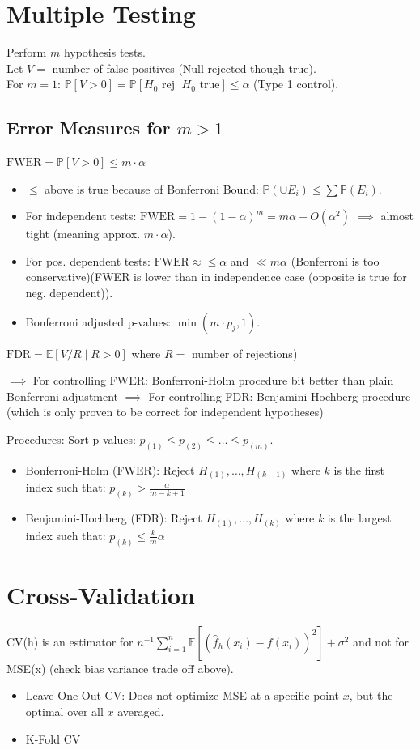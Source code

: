 \section{Multiple Testing}
Perform $m$ hypothesis tests.
\\ Let $V = $ number of false positives (Null rejected though true).
\\ For $m=1$: $\mathbb{P}[V > 0] = \mathbb{P}[H_0 \text{ rej } | H_0 \text{ true}] \leq \alpha$ (Type 1 control).

\subsection{Error Measures for $m > 1$}
$ \text{FWER} = \mathbb{P}[V > 0] \leq m \cdot \alpha $
\begin{itemize}
    \item $\leq$ above is true because of Bonferroni Bound: $\mathbb{P}(\cup E_i) \leq \sum \mathbb{P}(E_i)$.
    \item For independent tests:
    $ \text{FWER} = 1 - (1-\alpha)^m = m\alpha + O(\alpha^2) $
    $\implies$ almost tight (meaning approx. $m \cdot \alpha$).
    \item For pos. dependent tests: $\text{FWER} \approx \leq \alpha$ and $\ll m\alpha$ (Bonferroni is too conservative)(FWER is lower than in independence case (opposite is true for neg. dependent)).
    \item Bonferroni adjusted p-values: $\min(m \cdot p_j, 1)$.
\end{itemize}

$\text{FDR} = \mathbb{E}[V/R \mid R > 0]$ where $R =$ number of rejections)

$\implies$ For controlling FWER: Bonferroni-Holm procedure bit better than plain Bonferroni adjustment
$\implies$ For controlling FDR: Benjamini-Hochberg procedure (which is only proven to be correct for independent hypotheses)

Procedures: Sort p-values: $p_{(1)} \leq p_{(2)} \leq \dots \leq p_{(m)}$.
\begin{itemize}
    \item Bonferroni-Holm (FWER):
    Reject $H_{(1)}, \dots, H_{(k-1)}$ where $k$ is the first index such that:
    $ p_{(k)} > \frac{\alpha}{m-k+1} $
    \item Benjamini-Hochberg (FDR):
    Reject $H_{(1)}, \dots, H_{(k)}$ where $k$ is the largest index such that:
    $ p_{(k)} \leq \frac{k}{m}\alpha $
\end{itemize}
\section{Cross-Validation}
CV(h) is an estimator for $n^{-1} \sum_{i=1}^{n} \mathbb{E}[(\hat{f}_h(x_i) - f(x_i))^2] + \sigma^2$ and not for MSE(x) (check bias variance trade off above).
\begin{itemize}
    \item Leave-One-Out CV:
    Does not optimize MSE at a specific point $x$, but the optimal over all $x$ averaged.
    \item K-Fold CV
\end{itemize}